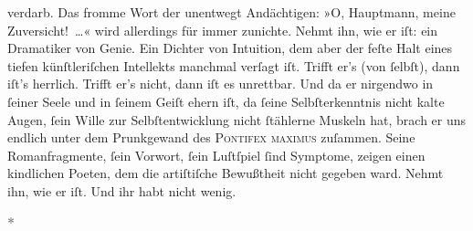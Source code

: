{{                  verdarb. Das fromme Wort der unentwegt Andächtigen: »O, Hauptmann, meine Zuversicht! {\dots}«
                  wird allerdings für immer zunichte. Nehmt ihn, wie er iſt: ein Dramatiker von
                  Genie. Ein Dichter von Intuition, dem aber der feſte Halt eines tiefen
                  künſtleriſchen Intellekts manchmal verſagt iſt. Trifft er’s (von ſelbſt), dann
                  iſt’s herrlich. Trifft er’s nicht, dann iſt es unrettbar. Und da er nirgendwo in
                  ſeiner Seele und in ſeinem Geiſt ehern iſt, da ſeine Selbſterkenntnis nicht kalte
                  Augen, ſein Wille zur Selbſtentwicklung nicht ſtählerne Muskeln hat, brach er uns
                  endlich unter dem Prunkgewand des \textsc{Pontifex maximus}
                  zuſammen. Seine Romanfragmente, ſein Vorwort, ſein Luſtſpiel ſind Symptome, zeigen einen kindlichen Poeten, dem die
                  artiſtiſche Bewußtheit nicht gegeben ward. Nehmt ihn, wie er iſt. Und ihr habt
                  nicht wenig.}}\pend
           
\pstart
           \centering{}\textcolor{gray}{\textbf{*}}\pend
           

